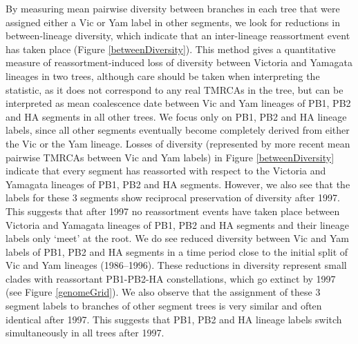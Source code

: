 \documentclass[11pt,oneside,letterpaper]{article}
\begin{document}
By measuring mean pairwise diversity between branches in each tree that were assigned either a Vic or Yam label in other segments, we look for reductions in between-lineage diversity, which indicate that an inter-lineage reassortment event has taken place (Figure \ref{betweenDiversity}).
This method gives a quantitative measure of reassortment-induced loss of diversity between Victoria and Yamagata lineages in two trees, although care should be taken when interpreting the statistic, as it does not correspond to any real TMRCAs in the tree, but can be interpreted as mean coalescence date between Vic and Yam lineages of PB1, PB2 and HA segments in all other trees.
We focus only on PB1, PB2 and HA lineage labels, since all other segments eventually become completely derived from either the Vic or the Yam lineage.
Losses of diversity (represented by more recent mean pairwise TMRCAs between Vic and Yam labels) in Figure \ref{betweenDiversity} indicate that every segment has reassorted with respect to the Victoria and Yamagata lineages of PB1, PB2 and HA segments.
However, we also see that the labels for these 3 segments show reciprocal preservation of diversity after 1997.
This suggests that after 1997 no reassortment events have taken place between Victoria and Yamagata lineages of PB1, PB2 and HA segments and their lineage labels only `meet' at the root.
We do see reduced diversity between Vic and Yam labels of PB1, PB2 and HA segments in a time period close to the initial split of Vic and Yam lineages (1986--1996).
These reductions in diversity represent small clades with reassortant PB1-PB2-HA constellations, which go extinct by 1997 (see Figure \ref{genomeGrid}).
We also observe that the assignment of these 3 segment labels to branches of other segment trees is very similar and often identical after 1997.
This suggests that PB1, PB2 and HA lineage labels switch simultaneously in all trees after 1997.
\end{document}
